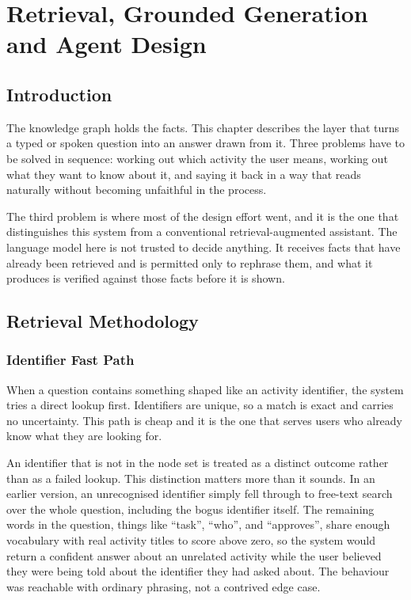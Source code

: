 \chapter{Retrieval, Grounded Generation and Agent Design}
\minitoc

\section*{Introduction}

The knowledge graph holds the facts. This chapter describes the layer that turns a typed or spoken question into an answer drawn from it. Three problems have to be solved in sequence: working out which activity the user means, working out what they want to know about it, and saying it back in a way that reads naturally without becoming unfaithful in the process.

The third problem is where most of the design effort went, and it is the one that distinguishes this system from a conventional retrieval-augmented assistant. The language model here is not trusted to decide anything. It receives facts that have already been retrieved and is permitted only to rephrase them, and what it produces is verified against those facts before it is shown.

\section{Retrieval Methodology}

\subsection{Identifier Fast Path}

When a question contains something shaped like an activity identifier, the system tries a direct lookup first. Identifiers are unique, so a match is exact and carries no uncertainty. This path is cheap and it is the one that serves users who already know what they are looking for.

An identifier that is not in the node set is treated as a distinct outcome rather than as a failed lookup. This distinction matters more than it sounds. In an earlier version, an unrecognised identifier simply fell through to free-text search over the whole question, including the bogus identifier itself. The remaining words in the question, things like ``task'', ``who'', and ``approves'', share enough vocabulary with real activity titles to score above zero, so the system would return a confident answer about an unrelated activity while the user believed they were being told about the identifier they had asked about. The behaviour was reachable with ordinary phrasing, not a contrived edge case.


